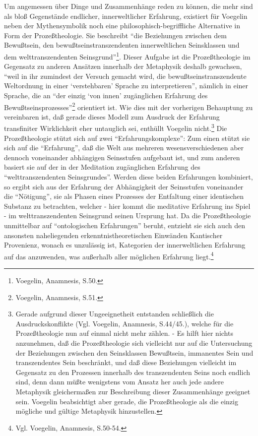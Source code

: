 Um angemessen über Dinge und Zusammenhänge reden zu können, die mehr
sind als bloß Gegenstände endlicher, innerweltlicher Erfahrung,
existiert für Voegelin neben der Mythensymbolik noch eine
philosophisch-begriffliche Alternative in Form der Prozeßtheologie. Sie
beschreibt "`die Beziehungen zwischen dem Bewußtsein, den
bewußtseinstranszendenten innerweltlichen Seinsklassen und dem
welttranszendenten Seinsgrund"'\footnote{Voegelin, Anamnesis, S.50.}.
Dieser Aufgabe ist die Prozeßtheologie im Gegensatz zu anderen Ansätzen
innerhalb der Metaphysik deshalb gewachsen, "`weil in ihr zumindest der
Versuch gemacht wird, die bewußtseinstranszendente Weltordnung in einer
`verstehbaren' Sprache zu interpretieren"', nämlich in einer Sprache,
die an "`der einzig `von innen' zugänglichen Erfahrung des
Bewußtseinsprozesses"'\footnote{Voegelin, Anamnesis, S.51.} orientiert
ist. Wie dies mit der vorherigen Behauptung zu vereinbaren ist, daß
gerade dieses Modell zum Ausdruck der Erfahrung transfiniter
Wirklichkeit eher untauglich sei, enthüllt Voegelin
nicht.\footnote{Gerade aufgrund dieser Ungeeignetheit entstanden
  schließlich die Ausdruckskonflikte (Vgl. Voegelin, Anamnesis,
  S.44/45.), welche für die Prozeßtheologie nun auf einmal nicht mehr
  zählen. - Es hilft hier nichts anzunehmen, daß die Prozeßtheologie
  sich vielleicht nur auf die Untersuchung der Beziehungen zwischen den
  Seinsklassen Bewußtsein, immanentes Sein und transzendentes Sein
  beschränkt, und daß diese Beziehungen vielleicht im Gegensatz zu den
  Prozessen innerhalb des transzendenten Seins noch endlich sind, denn
  dann müßte wenigstens vom Ansatz her auch jede andere Metaphysik
  gleichermaßen zur Beschreibung dieser Zusammenhänge geeignet sein.
  Voegelin beabsichtigt aber gerade, die Prozeßtheologie als die einzig
  mögliche und gültige Metaphysik hinzustellen.} Die Prozeßtheologie
stützt sich auf zwei "`Erfahrungskomplexe"': Zum einen stützt sie sich
auf die "`Erfahrung"', daß die Welt aus mehreren wesensverschiedenen
aber dennoch voneinander abhängigen Seinsstufen aufgebaut ist, und zum
anderen basiert sie auf der in der Meditation zugänglichen Erfahrung des
"`welttranszendenten Seinsgrundes"'.  Werden diese beiden Erfahrungen
kombiniert, so ergibt sich aus der Erfahrung der Abhängigkeit der
Seinsstufen voneinander die "`Nötigung"', sie als Phasen eines Prozesses
der Entfaltung einer identischen Substanz zu betrachten, welcher - hier
kommt die meditative Erfahrung ins Spiel - im welttranszendenten
Seinsgrund seinen Ursprung hat. Da die Prozeßtheologie unmittelbar auf
"`ontologischen Erfahrungen"' beruht, entzieht sie sich auch den
ansonsten naheliegenden erkenntnistheoretischen Einwänden Kantischer
Provenienz, wonach es unzulässig ist, Kategorien der innerweltlichen
Erfahrung auf das anzuwenden, was außerhalb aller möglichen Erfahrung
liegt.\footnote{Vgl. Voegelin, Anamnesis, S.50-54.}


